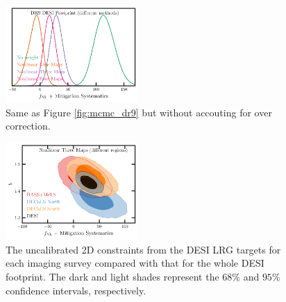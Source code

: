 \begin{figure}
    \centering
    \includegraphics[width=0.45\textwidth]{figures/mcmc_dr9methods1dnoshift.pdf}
    \caption{Same as Figure \ref{fig:mcmc_dr9} but without accouting for over correction. }
    \label{fig:mcmcdr9noshift}
\end{figure}
\begin{figure}
    \centering
    \includegraphics[width=0.45\textwidth]{figures/mcmc_dr9regions.pdf} 
    \caption{The uncalibrated 2D constraints from the DESI LRG targets for each imaging survey compared with that for the whole DESI footprint. The dark and light shades represent the $68\%$ and $95\%$ confidence intervals, respectively.}\label{fig:mcmc_dr9reg}
\end{figure}
